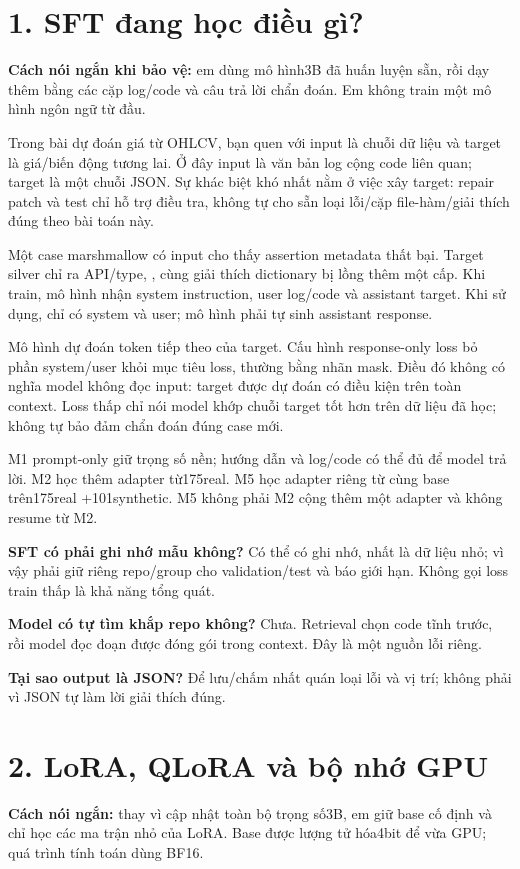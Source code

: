 \documentclass[12pt,a4paper]{article}
\begin{document}
\section*{1. SFT đang học điều gì?}
\textbf{Cách nói ngắn khi bảo vệ:} em dùng mô hình3B đã huấn luyện sẵn, rồi dạy thêm bằng các cặp log/code và câu trả lời chẩn đoán. Em không train một mô hình ngôn ngữ từ đầu.

Trong bài dự đoán giá từ OHLCV, bạn quen với input là chuỗi dữ liệu và target là giá/biến động tương lai. Ở đây input là văn bản log cộng code liên quan; target là một chuỗi JSON. Sự khác biệt khó nhất nằm ở việc xây target: repair patch và test chỉ hỗ trợ điều tra, không tự cho sẵn loại lỗi/cặp file-hàm/giải thích đúng theo bài toán này.

Một case marshmallow có input cho thấy assertion metadata thất bại. Target silver chỉ ra API/type, , cùng giải thích dictionary bị lồng thêm một cấp. Khi train, mô hình nhận system instruction, user log/code và assistant target. Khi sử dụng, chỉ có system và user; mô hình phải tự sinh assistant response.

Mô hình dự đoán token tiếp theo của target. Cấu hình response-only loss bỏ phần system/user khỏi mục tiêu loss, thường bằng nhãn mask. Điều đó không có nghĩa model không đọc input: target được dự đoán có điều kiện trên toàn context. Loss thấp chỉ nói model khớp chuỗi target tốt hơn trên dữ liệu đã học; không tự bảo đảm chẩn đoán đúng case mới.

M1 prompt-only giữ trọng số nền; hướng dẫn và log/code có thể đủ để model trả lời. M2 học thêm adapter từ175real. M5 học adapter riêng từ cùng base trên175real +101synthetic. M5 không phải M2 cộng thêm một adapter và không resume từ M2.

\textbf{SFT có phải ghi nhớ mẫu không?} Có thể có ghi nhớ, nhất là dữ liệu nhỏ; vì vậy phải giữ riêng repo/group cho validation/test và báo giới hạn. Không gọi loss train thấp là khả năng tổng quát.\par
\textbf{Model có tự tìm khắp repo không?} Chưa. Retrieval chọn code tĩnh trước, rồi model đọc đoạn được đóng gói trong context. Đây là một nguồn lỗi riêng.\par
\textbf{Tại sao output là JSON?} Để lưu/chấm nhất quán loại lỗi và vị trí; không phải vì JSON tự làm lời giải thích đúng.

\nextpage
\section*{2. LoRA, QLoRA và bộ nhớ GPU}
\textbf{Cách nói ngắn:} thay vì cập nhật toàn bộ trọng số3B, em giữ base cố định và chỉ học các ma trận nhỏ của LoRA. Base được lượng tử hóa4bit để vừa GPU; quá trình tính toán dùng BF16.
\end{document}
